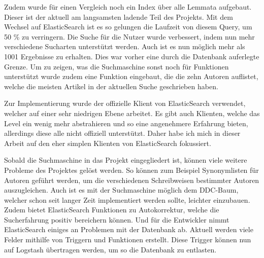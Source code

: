 Zudem wurde für einen Vergleich noch ein Index über alle Lemmata aufgebaut. Dieser ist der aktuell am langsamsten ladende Teil des Projekts. Mit dem Wechsel auf ElasticSearch ist es so gelungen die Laufzeit von diesem Query, um 50 \% zu verringern. Die Suche für die Nutzer wurde verbessert, indem nun mehr verschiedene Sucharten unterstützt werden. Auch ist es nun möglich mehr als 1001 Ergebnisse zu erhalten. Dies war vorher eine durch die Datenbank auferlegte Grenze. Um zu zeigen, was die Suchmaschine sonst noch für Funktionen unterstützt wurde zudem eine Funktion eingebaut, die die zehn Autoren auflistet, welche die meisten Artikel in der aktuellen Suche geschrieben haben. 

Zur Implementierung wurde der offizielle Klient von ElasticSearch verwendet, welcher auf einer sehr niedrigen Ebene arbeitet. Es gibt auch Klienten, welche das Level ein wenig mehr abstrahieren und so eine angenehmere Erfahrung bieten, allerdings diese alle nicht offiziell unterstützt. Daher habe ich mich in dieser Arbeit auf den eher simplen Klienten von ElasticSearch fokussiert. 

Sobald die Suchmaschine in das Projekt eingegliedert ist, können viele weitere Probleme des Projektes gelöst werden. So können zum Beispiel Synonymlisten für Autoren geführt werden, um die verschiedenen Schreibweisen bestimmter Autoren auszugleichen. Auch ist es mit der Suchmaschine möglich dem DDC-Baum, welcher schon seit langer Zeit implementiert werden sollte, leichter einzubauen. Zudem bietet ElasticSearch Funktionen zu Autokorrektur, welche die Sucherfahrung positiv bereichern können. Und für die Entwickler nimmt ElasticSearch einiges an Problemen mit der Datenbank ab. Aktuell werden viele Felder mithilfe von Triggern und Funktionen erstellt. Diese Trigger können nun auf Logstash übertragen werden, um so die Datenbank zu entlasten.